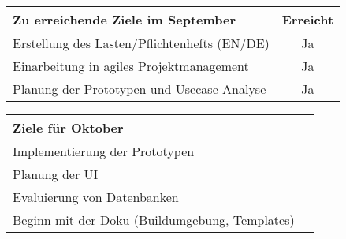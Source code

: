 \begin{tabularx}{\textwidth}{Xc}
    \arrayrulecolor{OliveGreen}
    \toprule
    {\bfseries Zu erreichende Ziele im September}        & {\bfseries Erreicht} \\
    \midrule[2pt]
    Erstellung des Lasten/Pflichtenhefts (EN/DE)         &Ja                    \\
    \rowcolor{OliveGreen!15}
    Einarbeitung in agiles Projektmanagement             &Ja                    \\
    \rowcolor{White}
    Planung der Prototypen und Usecase Analyse           &Ja                    \\
    \bottomrule[2pt]
\end{tabularx}
%
\vspace{1cm}
%
\begin{tabularx}{\textwidth}{Xc}
    \arrayrulecolor{OliveGreen}
    \toprule
    {\bfseries Ziele für Oktober}                        &                      \\
    \midrule[2pt]
    Implementierung der Prototypen                       &                      \\
    \rowcolor{OliveGreen!15}
    Planung der UI                                       &                      \\
    \rowcolor{White}
    Evaluierung von Datenbanken                          &                      \\
    \rowcolor{OliveGreen!15}
    Beginn mit der Doku (Buildumgebung, Templates)       &                      \\
\end{tabularx}
